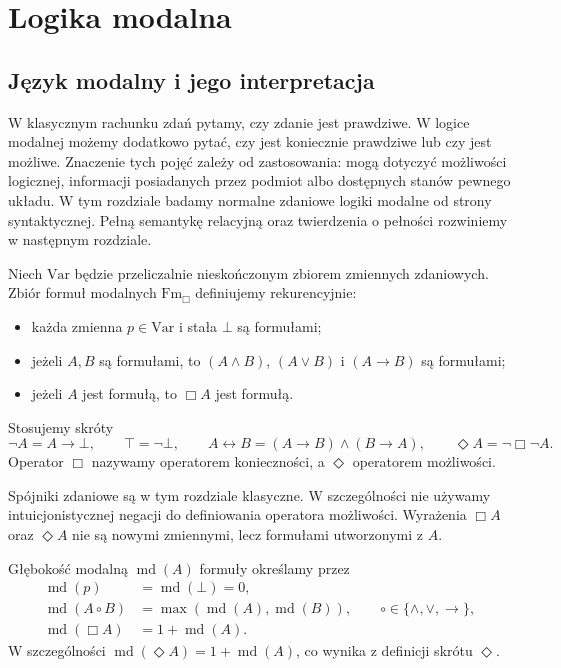 \chapter{Logika modalna}\label{ch:ncl-modal}

\section{Język modalny i jego interpretacja}

W klasycznym rachunku zdań pytamy, czy zdanie jest
prawdziwe. W logice modalnej możemy dodatkowo pytać,
czy jest koniecznie prawdziwe lub czy jest możliwe.
Znaczenie tych pojęć zależy od zastosowania: mogą
dotyczyć możliwości logicznej, informacji posiadanych
przez podmiot albo dostępnych stanów pewnego układu.
W tym rozdziale badamy normalne zdaniowe logiki
modalne od strony syntaktycznej. Pełną semantykę
relacyjną oraz twierdzenia o pełności rozwiniemy
w następnym rozdziale.

\begin{definicja}
\label{def:ncl-modal-language}
Niech $\mathrm{Var}$ będzie przeliczalnie nieskończonym
zbiorem zmiennych zdaniowych. Zbiór formuł modalnych
$\mathrm{Fm}_{\Box}$ definiujemy rekurencyjnie:
\begin{itemize}
\item każda zmienna $p\in\mathrm{Var}$ i stała $\bot$
      są formułami;
\item jeżeli $A,B$ są formułami, to
      $(A\wedge B)$, $(A\vee B)$ i $(A\to B)$
      są formułami;
\item jeżeli $A$ jest formułą, to $\Box A$ jest formułą.
\end{itemize}
Stosujemy skróty
\[
 \neg A=A\to\bot,\qquad
 \top=\neg\bot,\qquad
 A\leftrightarrow B=(A\to B)\wedge(B\to A),\qquad
 \Diamond A=\neg\Box\neg A.
\]
Operator $\Box$ nazywamy operatorem konieczności,
a $\Diamond$ operatorem możliwości.
\end{definicja}
Spójniki zdaniowe są w tym rozdziale klasyczne.
W szczególności nie używamy intuicjonistycznej
negacji do definiowania operatora możliwości.
Wyrażenia $\Box A$ oraz $\Diamond A$ nie są
nowymi zmiennymi, lecz formułami utworzonymi
z $A$.

\begin{definicja}
\label{def:ncl-modal-depth}
Głębokość modalną $\operatorname{md}(A)$ formuły
określamy przez
\[
\begin{aligned}
 \operatorname{md}(p)&=\operatorname{md}(\bot)=0,\\
 \operatorname{md}(A\circ B)
 &=\max(\operatorname{md}(A),\operatorname{md}(B)),
 \qquad \circ\in\{\wedge,\vee,\to\},\\
 \operatorname{md}(\Box A)&=1+\operatorname{md}(A).
\end{aligned}
\]
W szczególności $\operatorname{md}(\Diamond A)
=1+\operatorname{md}(A)$, co wynika z definicji
skrótu $\Diamond$.
\end{definicja}


